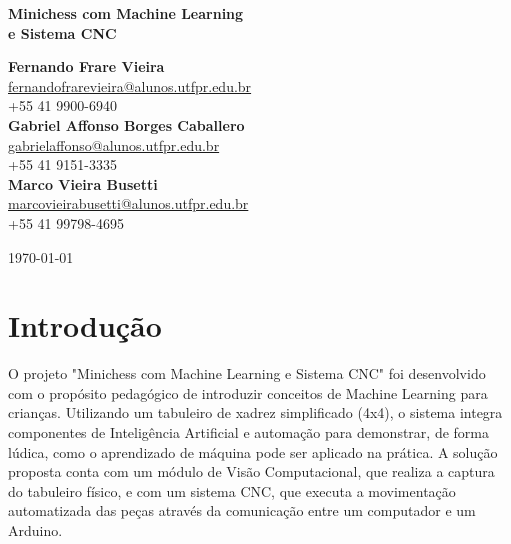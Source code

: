 \documentclass[a4paper,12pt]{article}
\date{\today}
\begin{document}
  

\vspace{1em}  
\begin{center}  
    \Large\textbf{Minichess com Machine Learning \\e Sistema CNC}  
\end{center}  

\vspace{1em}  

\begin{center}  
    \textbf{Fernando Frare Vieira} \\  
    \href{mailto:fernandofrarevieira@alunos.utfpr.edu.br}{fernandofrarevieira@alunos.utfpr.edu.br} \\  
    +55 41 9900-6940 \\[1.5em]  
    \textbf{Gabriel Affonso Borges Caballero} \\  
    \href{mailto:gabrielaffonso@alunos.utfpr.edu.br}{gabrielaffonso@alunos.utfpr.edu.br} \\  
    +55 41 9151-3335\\[1.5em]  
    \textbf{Marco Vieira Busetti} \\  
    \href{mailto:marcovieirabusetti@alunos.utfpr.edu.br}{marcovieirabusetti@alunos.utfpr.edu.br} \\  
    +55 41 99798-4695  
\end{center}  

\vspace{1em}  
\begin{center}  
    \today  
\end{center}  
\vspace{2em}  

\section{Introdução}  
O projeto "Minichess com Machine Learning e Sistema CNC" \; foi desenvolvido com o propósito pedagógico de introduzir conceitos de Machine Learning para crianças. Utilizando um tabuleiro de xadrez simplificado (4x4), o sistema integra componentes de Inteligência Artificial e automação para demonstrar, de forma lúdica, como o aprendizado de máquina pode ser aplicado na prática. A solução proposta conta com um módulo de Visão Computacional, que realiza a captura do tabuleiro físico, e com um sistema CNC, que executa a movimentação automatizada das peças através da comunicação entre um computador e um Arduino.  
\end{document}
